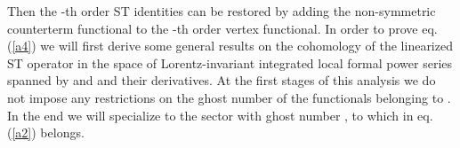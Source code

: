 \documentclass[a4paper,11pt]{article}
\begin{document}
Then the \coordHE{}-th order ST identities can  be restored by adding 
the non-symmetric counterterm functional
 \coordHE{} to the \coordHE{}-th order vertex functional.
%
In order to prove eq.(\ref{a4}) we will first derive
some general results on the cohomology \coordHE{} 
of the linearized ST operator \coordHE{} in the space
of Lorentz-invariant integrated local formal power series
spanned by \coordHE{} and \myHighlight{$\lambda,\chi$}\coordHE{} and their derivatives.
At the first stages of this analysis we do not impose any restrictions
on the ghost number  of the functionals belonging to \coordHE{}. In the end
we will specialize to the sector with ghost number \coordHE{}, to which
\coordHE{} in eq.(\ref{a2}) belongs. 
\end{document}
